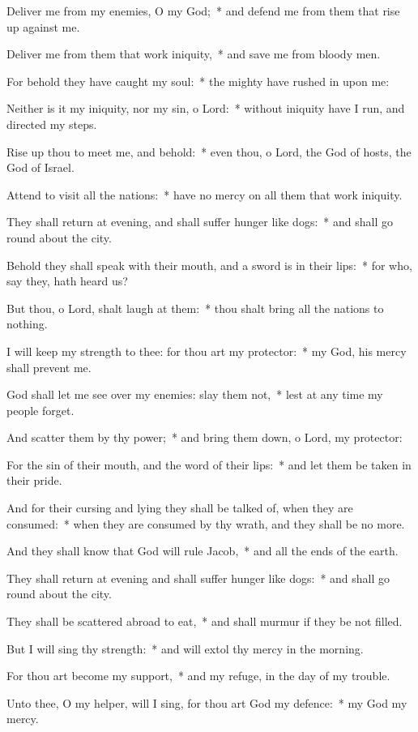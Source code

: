 \begin{enpars}
\item Deliver me from my enemies, O my God;~* and defend me from them that rise up against me.
\item Deliver me from them that work iniquity,~* and save me from bloody men.
\item For behold they have caught my soul:~* the mighty have rushed in upon me:
\item Neither is it my iniquity, nor my sin, o Lord:~* without iniquity have I run, and directed my steps.
\item Rise up thou to meet me, and behold:~* even thou, o Lord, the God of hosts, the God of Israel.
\item Attend to visit all the nations:~* have no mercy on all them that work iniquity.
\item They shall return at evening, and shall suffer hunger like dogs:~* and shall go round about the city.
\item Behold they shall speak with their mouth, and a sword is in their lips:~* for who, say they, hath heard us?
\item But thou, o Lord, shalt laugh at them:~* thou shalt bring all the nations to nothing.
\item I will keep my strength to thee: for thou art my protector:~* my God, his mercy shall prevent me.
\item God shall let me see over my enemies: slay them not,~* lest at any time my people forget.
\item And scatter them by thy power;~* and bring them down, o Lord, my protector:
\item For the sin of their mouth, and the word of their lips:~* and let them be taken in their pride.
\item And for their cursing and lying they shall be talked of, when they are consumed:~* when they are consumed by thy wrath, and they shall be no more.
\item And they shall know that God will rule Jacob,~* and all the ends of the earth.
\item They shall return at evening and shall suffer hunger like dogs:~* and shall go round about the city.
\item They shall be scattered abroad to eat,~* and shall murmur if they be not filled.
\item But I will sing thy strength:~* and will extol thy mercy in the morning.
\item For thou art become my support,~* and my refuge, in the day of my trouble.
\item Unto thee, O my helper, will I sing, for thou art God my defence:~* my God my mercy.
\end{enpars}
